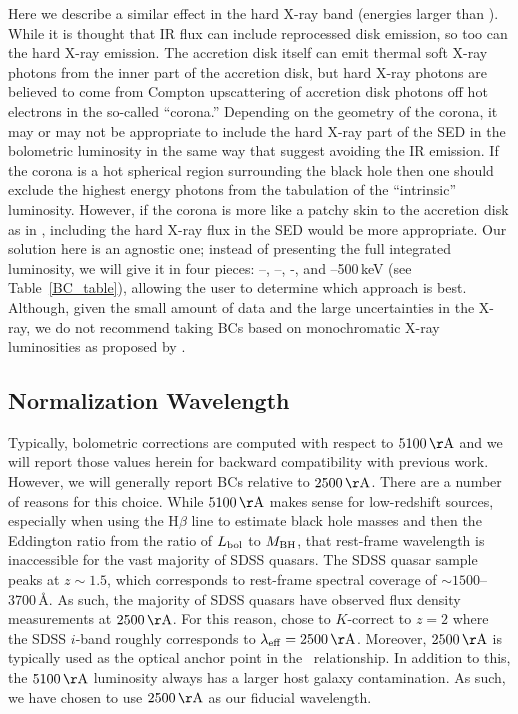 Here we describe a similar effect in the hard X-ray band (energies larger than \twokev).  While it is thought that IR flux can include reprocessed disk emission, so too can the hard X-ray emission.  The accretion disk itself can emit thermal soft X-ray photons from the inner part of the accretion disk, but hard X-ray photons are believed to come from Compton upscattering of accretion disk photons off hot electrons in the so-called ``corona.''  Depending on the geometry of the corona, it may or may not be appropriate to include the hard X-ray part of the SED in the bolometric luminosity in the same way that \citet{Marconi:2004} suggest avoiding the IR emission.  If the corona is a hot spherical region surrounding the black hole \citep{Sobolewska:2004} then one should exclude the highest energy photons from the tabulation of the ``intrinsic'' luminosity.  However, if the corona is more like a patchy skin to the accretion disk as in \citet{Sobolewska:2004a}, including the hard X-ray flux in the SED would be more appropriate.  Our solution here is an agnostic one; instead of presenting the full integrated luminosity, we will give it in four pieces: \thirtymum--\onemum, \onemum--\twokev, \twokev\--\tenkev, and \tenkev--500\,keV (see Table~\ref{BC_table}), allowing the user to determine which approach is best. 
Although, given the small amount of data and the large uncertainties in the X-ray, we do not recommend taking BCs based on monochromatic X-ray luminosities as proposed by \citet{Vasudevan:2007}.



\subsection{Normalization Wavelength}

Typically, bolometric corrections are computed with respect to $5100\,{\rm \AA}$ and we will report those values herein for backward compatibility with previous work.  However, we will generally report BCs relative to $2500\,{\rm \AA}$.  There are a number of reasons for this choice.  While $5100\,{\rm \AA}$ makes sense for low-redshift sources, especially when using the H$\beta$ line to estimate black hole masses and then the Eddington ratio from the ratio of $L_{\rm bol}$ to $M_{\rm BH}$, that rest-frame wavelength is inaccessible for the vast majority of SDSS quasars.  The SDSS quasar sample peaks at $z\sim1.5$, which corresponds to rest-frame spectral coverage of $\sim1500$--3700\,\AA.  As such, the majority of SDSS quasars have observed flux density measurements at $2500\,{\rm \AA}$.  For this reason, \citet{Richards:2006a} chose to $K$-correct to $z=2$ where the SDSS $i$-band roughly corresponds to $\lambda_{\rm eff}=2500\,{\rm \AA}$.  Moreover, $2500\,{\rm \AA}$ is typically used as the optical anchor point in the \luvaox\ relationship.  In addition to this, the $5100\,{\rm \AA}$ luminosity always has a larger host galaxy contamination.  As such, we have chosen to use $2500\,{\rm \AA}$ as our fiducial wavelength.

